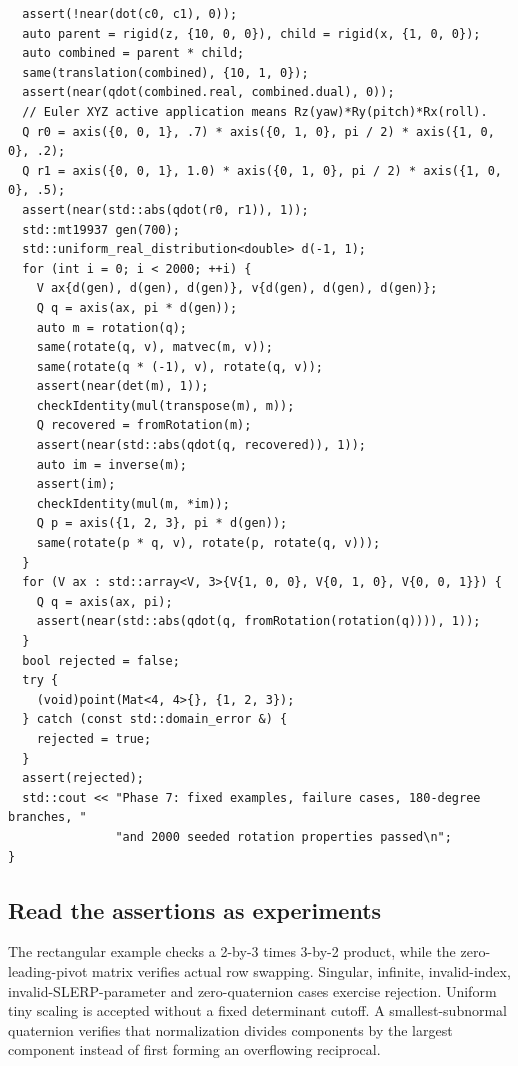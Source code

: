 \begin{verbatim}
  assert(!near(dot(c0, c1), 0));
  auto parent = rigid(z, {10, 0, 0}), child = rigid(x, {1, 0, 0});
  auto combined = parent * child;
  same(translation(combined), {10, 1, 0});
  assert(near(qdot(combined.real, combined.dual), 0));
  // Euler XYZ active application means Rz(yaw)*Ry(pitch)*Rx(roll).
  Q r0 = axis({0, 0, 1}, .7) * axis({0, 1, 0}, pi / 2) * axis({1, 0, 0}, .2);
  Q r1 = axis({0, 0, 1}, 1.0) * axis({0, 1, 0}, pi / 2) * axis({1, 0, 0}, .5);
  assert(near(std::abs(qdot(r0, r1)), 1));
  std::mt19937 gen(700);
  std::uniform_real_distribution<double> d(-1, 1);
  for (int i = 0; i < 2000; ++i) {
    V ax{d(gen), d(gen), d(gen)}, v{d(gen), d(gen), d(gen)};
    Q q = axis(ax, pi * d(gen));
    auto m = rotation(q);
    same(rotate(q, v), matvec(m, v));
    same(rotate(q * (-1), v), rotate(q, v));
    assert(near(det(m), 1));
    checkIdentity(mul(transpose(m), m));
    Q recovered = fromRotation(m);
    assert(near(std::abs(qdot(q, recovered)), 1));
    auto im = inverse(m);
    assert(im);
    checkIdentity(mul(m, *im));
    Q p = axis({1, 2, 3}, pi * d(gen));
    same(rotate(p * q, v), rotate(p, rotate(q, v)));
  }
  for (V ax : std::array<V, 3>{V{1, 0, 0}, V{0, 1, 0}, V{0, 0, 1}}) {
    Q q = axis(ax, pi);
    assert(near(std::abs(qdot(q, fromRotation(rotation(q)))), 1));
  }
  bool rejected = false;
  try {
    (void)point(Mat<4, 4>{}, {1, 2, 3});
  } catch (const std::domain_error &) {
    rejected = true;
  }
  assert(rejected);
  std::cout << "Phase 7: fixed examples, failure cases, 180-degree branches, "
               "and 2000 seeded rotation properties passed\n";
}
\end{verbatim}

\subsection{Read the assertions as experiments}\label{02-foundations-ii-ch038-read-the-assertions-as-experiments}

\hypertarget{02-foundations-ii-ch038-read-the-assertions-as-experiments}{}

The rectangular example checks a 2-by-3 times 3-by-2 product, while the zero-leading-pivot matrix verifies actual row swapping. Singular, infinite, invalid-index, invalid-SLERP-parameter and zero-quaternion cases exercise rejection. Uniform tiny scaling is accepted without a fixed determinant cutoff. A smallest-subnormal quaternion verifies that normalization divides components by the largest component instead of first forming an overflowing reciprocal.

